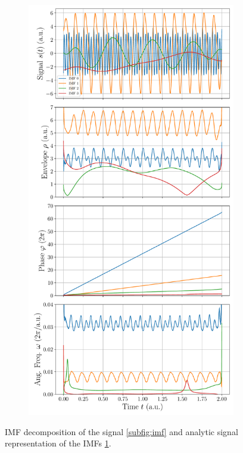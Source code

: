 \documentclass[a4paper,DIV=12,english]{scrartcl}
\begin{document}
\begin{figure}
\begin{subfigure}{0.49\textwidth}
    \end{subfigure}
    \begin{subfigure}{0.49\textwidth}
        \centering
        \includegraphics[width=\textwidth]{../imf_analytic_sig.pdf}
        \caption{}
        \label{subfig:as}
    \end{subfigure}
    \caption{IMF decomposition of the signal \ref{subfig:imf} and analytic signal representation of the IMFs \ref{subfig:as}.}
    \label{fig:imf}
\end{figure}
\end{document}
